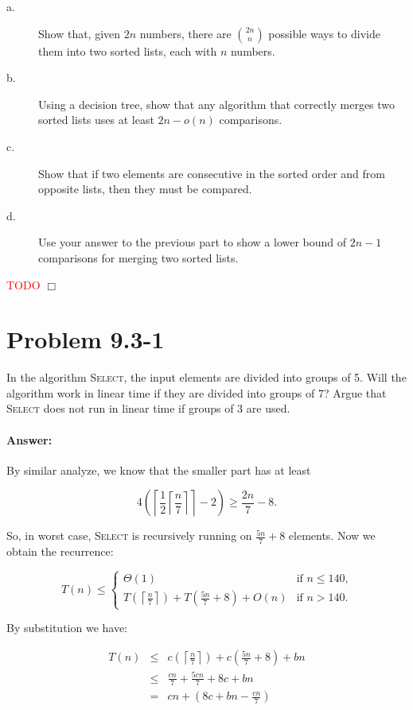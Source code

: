 \documentclass[a4paper,10pt]{article}
\newcommand{\problem}[1]{\section*{Problem #1}}
\newcommand{\answer}{\paragraph{Answer:}}
\newcommand{\qed}{\hfill \ensuremath{\Box}}
\newcommand{\todo}{\textcolor{red}{TODO}{} }
\begin{document}
\begin{description}
\item[a. \hspace{9pt}] Show that, given $2n$ numbers, there are ${2n}\choose{n}$ possible ways to divide them into
two sorted lists, each with $n$ numbers.

\item[b. \hspace{9pt}] Using a decision tree, show that any algorithm that correctly merges two sorted lists uses at
least $2n-o(n)$ comparisons.

\item[c. \hspace{9pt}]  Show that if two elements are consecutive in the sorted order and from opposite lists,
then they must be compared.

\item[d. \hspace{9pt}] Use your answer to the previous part to show a lower bound of $2n-1$ comparisons for merging
two sorted lists.

\end{description}

\todo
\qed



\problem{9.3-1}
In the algorithm \textsc{Select}, the input elements are divided into groups of 5.
Will the algorithm work in linear time if they are divided into groups of 7? Argue that
\textsc{Select} does not run in linear time if groups of 3 are used.
\answer

By similar analyze, we know that the smaller part has at least

$$ 4\left(\left\lceil\frac{1}{2}\left\lceil\frac{n}{7}\right\rceil\right\rceil-2\right)\geq \frac{2n}{7} - 8.$$

So, in worst case, \textsc{Select} is recursively running on $\frac{5n}{7} + 8$ elements. Now we obtain the recurrence:

\begin{equation*}
T(n) \leq \left\{
  \begin{array}{ll}
    \Theta(1)     & \text{if $n \leq 140$,}\\
    T\left(\left\lceil\frac{n}{7}\right\rceil\right) + T\left(\frac{5n}{7} + 8\right) + O(n) & \text{if $n > 140$.}
  \end{array}
\right.
\end{equation*}

By substitution we have:

\begin{eqnarray*}
T(n)  &\leq& c\left(\left\lceil\frac{n}{7}\right\rceil\right) + c\left(\frac{5n}{7} + 8\right) + bn\\
&\leq& \frac{cn}{7} + \frac{5cn}{7} + 8c + bn\\
&=&cn + \left(8c + bn - \frac{cn}{7}\right)
\end{eqnarray*}
\end{document}
